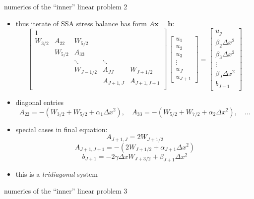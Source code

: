 \begin{frame}{numerics of the ``inner'' linear problem 2}

\footnotesize
\begin{itemize}
\item thus iterate of SSA stress balance has form  \quad $A \mathbf{x} = \mathbf{b}$:
$$
\begin{bmatrix}
1 &  &  &  &  \\
W_{3/2} & A_{22} & W_{5/2} &  &  \\
 & W_{5/2} & A_{33} &  &  \\
 &  & \ddots & \ddots &  \\
 &  & W_{J-1/2} & A_{JJ} & W_{J+1/2} \\
 &  &  & A_{J+1,J} & A_{J+1,J+1} \\
\end{bmatrix}\,
\begin{bmatrix}
u_1 \\ u_2 \\ u_3 \\ \vdots \\ u_J \\ u_{J+1}
\end{bmatrix}
=
\begin{bmatrix}
u_g \\ \beta_2 \Delta x^2 \\ \beta_3 \Delta x^2 \\ \vdots \\ \beta_J \Delta x^2 \\ b_{J+1}
\end{bmatrix}
$$
\item diagonal entries
$$A_{22} = -(W_{3/2}+W_{5/2}+\alpha_1 \Delta x^2), \quad A_{33} = -(W_{5/2}+W_{7/2}+\alpha_2 \Delta x^2), \quad \dots$$
\item special cases in final equation:
$$A_{J+1,J} = 2 W_{J+1/2}$$
$$A_{J+1,J+1} = -(2 W_{J+1/2}+\alpha_{J+1}\Delta x^2)$$
$$b_{J+1} = -2 \gamma \Delta x W_{J+3/2} + \beta_{J+1} \Delta x^2$$
\item this is a \emph{tridiagonal} system
\end{itemize}
\end{frame}


\begin{frame}{numerics of the ``inner'' linear problem 3}
\label{slide:flowlinecode}

\end{frame}


